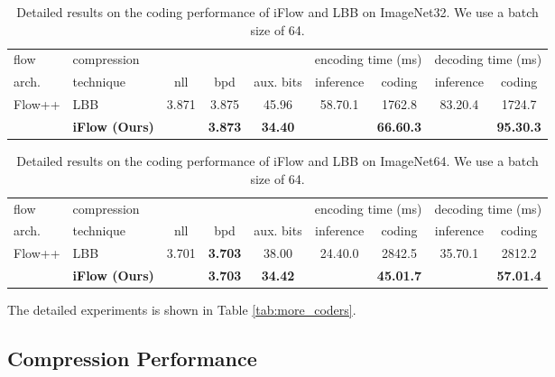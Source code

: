 \documentclass{article}
\newcommand{\ebar}[1]{{\tiny #1}}
\begin{document}
\begin{table}[h]
\centering
\small
\caption{Detailed results on the coding performance of iFlow and LBB on ImageNet32. We use a batch size of 64.}
\label{tab:baselines_img32}
\begin{tabular}{llccccccc}
\toprule
flow & compression & & & & \multicolumn{2}{c}{encoding time (ms)} & \multicolumn{2}{c}{decoding time (ms)}\\
arch. & technique & nll & bpd & aux. bits & inference & coding &  inference & coding \\
\midrule
\multirow{2}{*}{Flow++} & LBB~\cite{ho2019compression} & \multirow{2}{*}{3.871} & 3.875 & 45.96 & \multirow{2}{*}{58.7\ebar{0.1}} & 176\ebar{2.8} & \multirow{2}{*}{83.2\ebar{0.4}} & 172\ebar{4.7} \\
 & \textbf{iFlow (Ours)} & & \textbf{3.873} & \textbf{34.40} & & \textbf{66.6\ebar{0.3}} & & \textbf{95.3\ebar{0.3}} \\
\bottomrule
\end{tabular}
\end{table}

\begin{table}[h]
\centering
\small
\caption{Detailed results on the coding performance of iFlow and LBB on ImageNet64. We use a batch size of 64.}
\label{tab:baselines_img64}
\begin{tabular}{llccccccc}
\toprule
flow & compression & & & & \multicolumn{2}{c}{encoding time (ms)} & \multicolumn{2}{c}{decoding time (ms)}\\
arch. & technique & nll & bpd & aux. bits & inference & coding &  inference & coding \\
\midrule
\multirow{2}{*}{Flow++} & LBB~\cite{ho2019compression} & \multirow{2}{*}{3.701} & \textbf{3.703} & 38.00 & \multirow{2}{*}{24.4\ebar{0.0}} & 284\ebar{2.5} & \multirow{2}{*}{35.7\ebar{0.1}} & 281\ebar{2.2} \\
 & \textbf{iFlow (Ours)} & & \textbf{3.703} & \textbf{34.42} & & \textbf{45.0\ebar{1.7}} & & \textbf{57.0\ebar{1.4}} \\
\bottomrule
\end{tabular}
\end{table}

The detailed experiments is shown in Table \ref{tab:more_coders}.

\subsection{Compression Performance}
\end{document}
